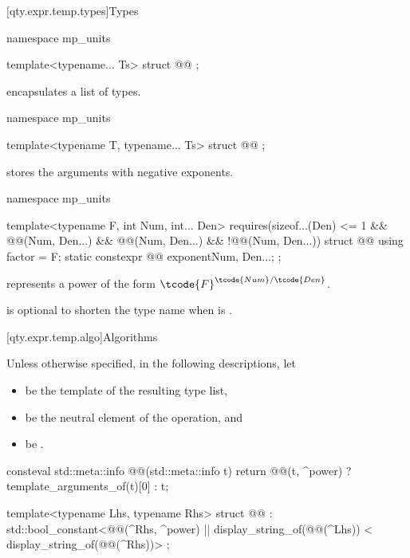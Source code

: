 [qty.expr.temp.types]{Types}

\begin{codeblock}
namespace mp_units {

template<typename... Ts>
struct @@ {};

}
\end{codeblock}

\pnum
{} encapsulates a list of types.

\begin{codeblock}
namespace mp_units {

template<typename T, typename... Ts>
struct @@ {};

}
\end{codeblock}

\pnum
{} stores the arguments with negative exponents.

\begin{codeblock}
namespace mp_units {

template<typename F, int Num, int... Den>
  requires(sizeof...(Den) <= 1 && @@(Num, Den...) && @@(Num, Den...) &&
           !@@(Num, Den...))
struct @@ {
  using factor = F;
  static constexpr @@ exponent{Num, Den...};
};

}
\end{codeblock}

\pnum
{} represents a power
of the form $\tcode{F}^{\tcode{Num}/\tcode{Den}}$.
\begin{note}
 is optional to shorten the type name when  is .
\end{note}

[qty.expr.temp.algo]{Algorithms}

\pnum
Unless otherwise specified, in the following descriptions, let
\begin{itemize}
\item
{} be the template of the resulting type list,
\item
{} be the neutral element of the operation, and
\item
{} be .
\end{itemize}

\begin{codeblock}
consteval std::meta::info @@(std::meta::info t)
{
  return @@(t, ^power) ? template_arguments_of(t)[0] : t;
}

template<typename Lhs, typename Rhs>
struct @@ :
    std::bool_constant<@@(^Rhs, ^power) ||
                       display_string_of(@@(^Lhs)) <
                         display_string_of(@@(^Rhs))> {
};
\end{codeblock}

